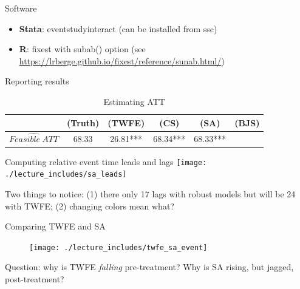 \documentclass{beamer}
\begin{document}
\begin{frame}{Software}

\begin{itemize}
\item \textbf{Stata}: eventstudyinteract (can be installed from ssc)
\item \textbf{R}: fixest with subab() option (see \url{https://lrberge.github.io/fixest/reference/sunab.html/})
\end{itemize}


\end{frame}


\begin{frame}{Reporting results}
\begin{table}[htbp]\centering
\small
\caption{Estimating ATT}
\begin{center}
\begin{tabular}{l*{5}{c}}
\hline
\multicolumn{1}{l}{\textbf{}}&
\multicolumn{1}{c}{\textbf{(Truth)}}&
\multicolumn{1}{c}{\textbf{(TWFE)}}&
\multicolumn{1}{c}{\textbf{(CS)}}&
\multicolumn{1}{c}{\textbf{(SA)}}&
\multicolumn{1}{c}{\textbf{(BJS)}}\\
\hline
$\widehat{Feasible\ ATT}$  & 68.33    & 26.81*** & 68.34*** & 68.33***&\\
\hline
\end{tabular}
\end{center}
\end{table}

\end{frame}

\begin{frame}{Computing relative event time leads and lags }
             \texttt{[image: ./lecture\_includes/sa\_leads]}

Two things to notice: (1) there only 17 lags with robust models but will be 24 with TWFE; (2) changing colors mean what?

\end{frame}

\begin{frame}{Comparing TWFE and SA }

\begin{figure}
\begin{center}
             \texttt{[image: ./lecture\_includes/twfe\_sa\_event]}
\end{center}
\end{figure}

Question: why is TWFE \emph{falling} pre-treatment?  Why is SA rising, but jagged, post-treatment?

\end{frame}
\end{document}
